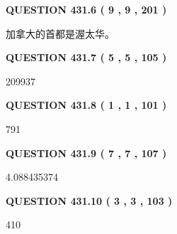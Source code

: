 \documentclass{ctexart}
\begin{document}
 
  
\vspace{0.2in}
  
{\textbf{\Large{QUESTION
431.6 
 ( 9 , 9 , 201 )
}}}
  
  
 
 
\noindent{}
 
 
加拿大的首都是渥太华。
 
 
 
 
  
\vspace{0.2in}
  
{\textbf{\Large{QUESTION
431.7 
 ( 5 , 5 , 105 )
}}}
  
  
 
 
\noindent{}

209937
 
 
  
\vspace{0.2in}
  
{\textbf{\Large{QUESTION
431.8 
 ( 1 , 1 , 101 )
}}}
  
  
 
 
\noindent{}

791
 
 
  
\vspace{0.2in}
  
{\textbf{\Large{QUESTION
431.9 
 ( 7 , 7 , 107 )
}}}
  
  
 
 
\noindent{}

4.088435374
 
 
  
\vspace{0.2in}
  
{\textbf{\Large{QUESTION
431.10 
 ( 3 , 3 , 103 )
}}}
  
  
 
 
\noindent{}

410
 
 
   
   
 \vspace{0.2in}
 
   
   
\end{document}
